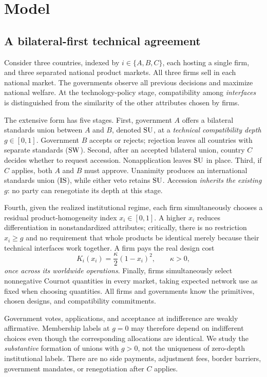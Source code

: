 \section{Model}\label{sec:model}

\subsection{A bilateral-first technical agreement}

Consider three countries, indexed by $i\in\{A,B,C\}$, each hosting a
single firm, and three separated national product markets. All three
firms sell in each national market. The governments observe all previous
decisions and maximize national welfare. At the technology-policy stage,
compatibility among \emph{interfaces} is distinguished from the
similarity of the other attributes chosen by firms.

The extensive form has five stages. First, government $A$ offers a
bilateral standards union between $A$ and $B$, denoted $\mathrm{SU}$, at
a \emph{technical compatibility depth} $g\in[0,1]$. Government $B$
accepts or rejects; rejection leaves all countries with separate
standards ($\mathrm{SW}$). Second, after an accepted bilateral union, country
$C$ decides whether to request accession. Nonapplication leaves $\mathrm{SU}$
in place. Third, if $C$ applies, both $A$ and $B$ must approve.
Unanimity produces an international standards union ($\mathrm{IS}$), while
either veto retains $\mathrm{SU}$. Accession \emph{inherits the existing $g$}:
no party can renegotiate its depth at this stage.

Fourth, given the realized institutional regime, each firm simultaneously
chooses a residual product-homogeneity index $x_i\in[0,1]$. A higher
$x_i$ reduces differentiation in nonstandardized attributes; critically,
there is no restriction $x_i\geq g$ and no requirement that whole
products be identical merely because their technical interfaces work
together. A firm pays the real design cost
\begin{equation}\label{eq:designcost}
 K_i(x_i)=\frac{\kappa}{2}(1-x_i)^2,\qquad \kappa>0,
\end{equation}
\emph{once across its worldwide operations}. Finally, firms
simultaneously select nonnegative Cournot quantities in every market,
taking expected network use as fixed when choosing quantities.
All firms and governments know the primitives, chosen designs, and
compatibility commitments.

Government votes, applications, and acceptance at indifference are
weakly affirmative. Membership labels at $g=0$ may therefore depend
on indifferent choices even though the corresponding allocations are
identical. We study the \emph{substantive} formation of unions with
$g>0$, not the uniqueness of zero-depth institutional labels.
There are no side payments, adjustment fees, border barriers,
government mandates, or renegotiation after $C$ applies.

